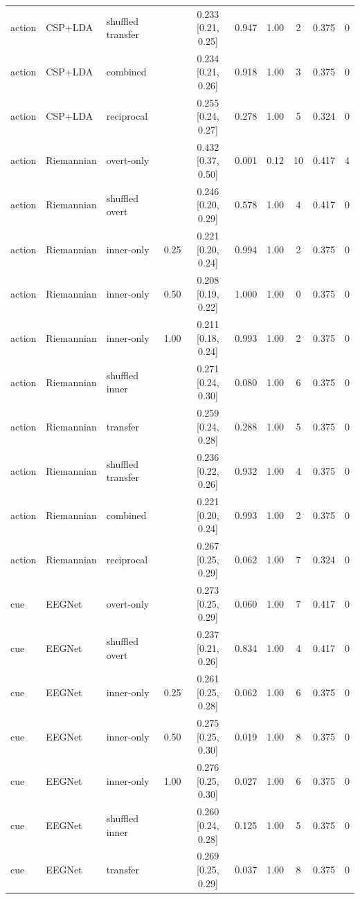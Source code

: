 \begin{longtable}{llllcccccc}
action & CSP+LDA & shuffled transfer &  & 0.233 [0.21, 0.25] & 0.947 & 1.00 & 2 & 0.375 & 0 \\
action & CSP+LDA & combined &  & 0.234 [0.21, 0.26] & 0.918 & 1.00 & 3 & 0.375 & 0 \\
action & CSP+LDA & reciprocal &  & 0.255 [0.24, 0.27] & 0.278 & 1.00 & 5 & 0.324 & 0 \\
action & Riemannian & overt-only &  & 0.432 [0.37, 0.50] & 0.001 & 0.12 & 10 & 0.417 & 4 \\
action & Riemannian & shuffled overt &  & 0.246 [0.20, 0.29] & 0.578 & 1.00 & 4 & 0.417 & 0 \\
action & Riemannian & inner-only & 0.25 & 0.221 [0.20, 0.24] & 0.994 & 1.00 & 2 & 0.375 & 0 \\
action & Riemannian & inner-only & 0.50 & 0.208 [0.19, 0.22] & 1.000 & 1.00 & 0 & 0.375 & 0 \\
action & Riemannian & inner-only & 1.00 & 0.211 [0.18, 0.24] & 0.993 & 1.00 & 2 & 0.375 & 0 \\
action & Riemannian & shuffled inner &  & 0.271 [0.24, 0.30] & 0.080 & 1.00 & 6 & 0.375 & 0 \\
action & Riemannian & transfer &  & 0.259 [0.24, 0.28] & 0.288 & 1.00 & 5 & 0.375 & 0 \\
action & Riemannian & shuffled transfer &  & 0.236 [0.22, 0.26] & 0.932 & 1.00 & 4 & 0.375 & 0 \\
action & Riemannian & combined &  & 0.221 [0.20, 0.24] & 0.993 & 1.00 & 2 & 0.375 & 0 \\
action & Riemannian & reciprocal &  & 0.267 [0.25, 0.29] & 0.062 & 1.00 & 7 & 0.324 & 0 \\
cue & EEGNet & overt-only &  & 0.273 [0.25, 0.29] & 0.060 & 1.00 & 7 & 0.417 & 0 \\
cue & EEGNet & shuffled overt &  & 0.237 [0.21, 0.26] & 0.834 & 1.00 & 4 & 0.417 & 0 \\
cue & EEGNet & inner-only & 0.25 & 0.261 [0.25, 0.28] & 0.062 & 1.00 & 6 & 0.375 & 0 \\
cue & EEGNet & inner-only & 0.50 & 0.275 [0.25, 0.30] & 0.019 & 1.00 & 8 & 0.375 & 0 \\
cue & EEGNet & inner-only & 1.00 & 0.276 [0.25, 0.30] & 0.027 & 1.00 & 6 & 0.375 & 0 \\
cue & EEGNet & shuffled inner &  & 0.260 [0.24, 0.28] & 0.125 & 1.00 & 5 & 0.375 & 0 \\
cue & EEGNet & transfer &  & 0.269 [0.25, 0.29] & 0.037 & 1.00 & 8 & 0.375 & 0 \\

\end{longtable}
